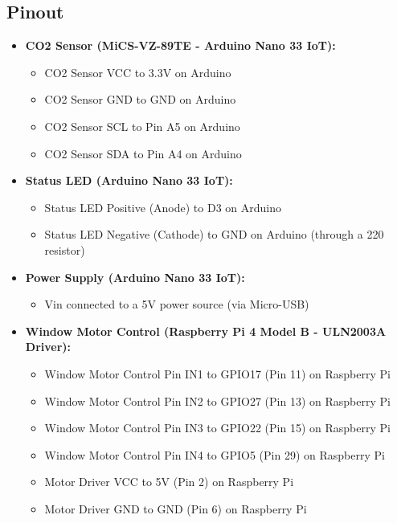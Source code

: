 \subsection{Pinout}
\begin{itemize}
    \item \textbf{CO2 Sensor (MiCS-VZ-89TE - Arduino Nano 33 IoT):}
    \begin{itemize}
        \item CO2 Sensor VCC to 3.3V on Arduino
        \item CO2 Sensor GND to GND on Arduino
        \item CO2 Sensor SCL to Pin A5 on Arduino
        \item CO2 Sensor SDA to Pin A4 on Arduino
    \end{itemize}
    
    \item \textbf{Status LED (Arduino Nano 33 IoT):}
    \begin{itemize}
        \item Status LED Positive (Anode) to D3 on Arduino
        \item Status LED Negative (Cathode) to GND on Arduino (through a 220 \ohm{} resistor)
    \end{itemize}
    
    \item \textbf{Power Supply (Arduino Nano 33 IoT):}
    \begin{itemize}
        \item Vin connected to a 5V power source (via Micro-USB)
    \end{itemize}

    \item \textbf{Window Motor Control (Raspberry Pi 4 Model B - ULN2003A Driver):}
    \begin{itemize}
        \item Window Motor Control Pin IN1 to GPIO17 (Pin 11) on Raspberry Pi
        \item Window Motor Control Pin IN2 to GPIO27 (Pin 13) on Raspberry Pi
        \item Window Motor Control Pin IN3 to GPIO22 (Pin 15) on Raspberry Pi
        \item Window Motor Control Pin IN4 to GPIO5 (Pin 29) on Raspberry Pi
        \item Motor Driver VCC to 5V (Pin 2) on Raspberry Pi
        \item Motor Driver GND to GND (Pin 6) on Raspberry Pi
    \end{itemize}


\end{itemize}
